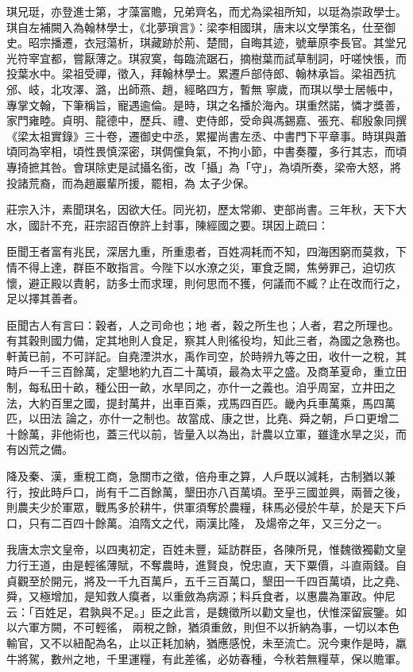 \begin{pinyinscope}
 琪兄珽，亦登進士第，才藻富贍，兄弟齊名，而尤為梁祖所知，以珽為崇政學士。琪自左補闕入為翰林學士，《北夢瑣言》：梁李相國琪，唐末以文學策名，仕至御史。昭宗播遷，衣冠蕩析，琪藏跡於荊、楚間，自晦其迹，號華原李長官。其堂兄光符宰宜都，嘗厭薄之。琪寂寞，每臨流踞石，摘樹葉而試草制詞，吁嗟怏悵，而投葉水中。梁祖受禪，徵入，拜翰林學士。累遷戶部侍郎、翰林承旨。梁祖西抗邠、岐，北攻澤、潞，出師燕、趙，經略四方，暫無
 寧歲，而琪以學士居帳中，專掌文翰，下筆稱旨，寵遇逾倫。是時，琪之名播於海內。琪重然諾，憐才獎善，家門雍睦。貞明、龍德中，歷兵、禮、吏侍郎，受命與馮錫嘉、張充、郗殷象同撰《梁太祖實錄》三十卷，遷御史中丞，累擢尚書左丞、中書門下平章事。時琪與蕭頃同為宰相，頃性畏慎深密，琪倜儻負氣，不拘小節，中書奏覆，多行其志，而頃專掎摭其咎。會琪除吏是試攝名銜，改「攝」為「守」，為頃所奏，梁帝大怒，將投諸荒裔，而為趙巖輩所援，罷相，為
 太子少保。



 莊宗入汴，素聞琪名，因欲大任。同光初，歷太常卿、吏部尚書。三年秋，天下大水，國計不充，莊宗詔百僚許上封事，陳經國之要。琪因上疏曰：



 臣聞王者富有兆民，深居九重，所重患者，百姓凋耗而不知，四海困窮而莫救，下情不得上達，群臣不敢指言。今陛下以水潦之災，軍食乏闕，焦勞罪己，迫切疚懷，避正殿以責躬，訪多士而求理，則何思而不獲，何議而不臧？止在改而行之，足以擇其善者。



 臣聞古人有言曰：穀者，人之司命也；地
 者，穀之所生也；人者，君之所理也。有其穀則國力備，定其地則人食足，察其人則徭役均，知此三者，為國之急務也。軒黃已前，不可詳記。自堯湮洪水，禹作司空，於時辨九等之田，收什一之稅，其時戶一千三百餘萬，定墾地約九百二十萬頃，最為太平之盛。及商革夏命，重立田制，每私田十畝，種公田一畝，水旱同之，亦什一之義也。洎乎周室，立井田之法，大約百里之國，提封萬井，出車百乘，戎馬四百匹。畿內兵車萬乘，馬四萬匹，以田法
 論之，亦什一之制也。故當成、康之世，比堯、舜之朝，戶口更增二十餘萬，非他術也，蓋三代以前，皆量入以為出，計農以立軍，雖逢水旱之災，而有凶荒之備。



 降及秦、漢，重稅工商，急關市之徵，倍舟車之算，人戶既以減耗，古制猶以兼行，按此時戶口，尚有千二百餘萬，墾田亦八百萬頃。至乎三國並興，兩晉之後，則農夫少於軍眾，戰馬多於耕牛，供軍須奪於農糧，秣馬必侵於牛草，於是天下戶口，只有二百四十餘萬。洎隋文之代，兩漢比隆，
 及煬帝之年，又三分之一。



 我唐太宗文皇帝，以四夷初定，百姓未豐，延訪群臣，各陳所見，惟魏徵獨勸文皇力行王道，由是輕徭薄賦，不奪農時，進賢良，悅忠直，天下粟價，斗直兩錢。自貞觀至於開元，將及一千九百萬戶，五千三百萬口，墾田一千四百萬頃，比之堯、舜，又極增加，是知救人瘼者，以重斂為病源；料兵食者，以惠農為軍政。仲尼云：「百姓足，君孰與不足。」臣之此言，是魏徵所以勸文皇也，伏惟深留宸鑒。如以六軍方闕，不可輕徭，
 兩稅之餘，猶須重斂，則但不以折納為事，一切以本色輸官，又不以紐配為名，止以正耗加納，猶應感悅，未至流亡。況今東作是時，羸牛將駕，數州之地，千里運糧，有此差徭，必妨春種，今秋若無糧草，保以贍軍。




\end{pinyinscope}
